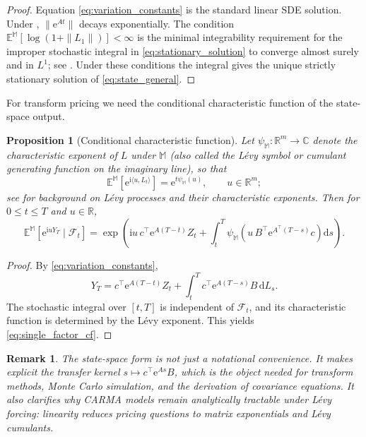 \documentclass[10pt,a4paper,reqno]{amsart}
\newtheorem{proposition}[theorem]{Proposition}
\newtheorem{remark}[theorem]{Remark}
\newcommand{\R}{\mathbb{R}}
\newcommand{\C}{\mathbb{C}}
\newcommand{\E}{\mathbb{E}}
\newcommand{\F}{\mathcal{F}}
\newcommand{\1}{\mathbbm{1}}
\newcommand{\dd}{\mathrm{d}}
\newcommand{\ii}{\mathrm{i}}
\newcommand{\ee}{\mathrm{e}}
\begin{document}
\begin{proof}
Equation \eqref{eq:variation_constants} is the standard linear SDE solution.
Under , \(\|\ee^{At}\|\) decays exponentially. The condition
\(\mathbb{E}^{\mathbb{M}}[\log(1+\|L_1\|)] < \infty\) is the minimal
integrability requirement for the improper stochastic integral in
\eqref{eq:stationary_solution} to converge almost surely and in \(L^1\);
see \citet{Bro01}. Under these conditions the integral gives the unique strictly
stationary solution of \eqref{eq:state_general}.
\end{proof}

For transform pricing we need the conditional characteristic function of the
state-space output.

\begin{proposition}[Conditional characteristic function]
\label{prop:cf_single_factor}
Let \(\psi_{\mathbb{M}}:\R^m \to \C\) denote the characteristic exponent of
\(L\) under \(\mathbb{M}\) (also called the Lévy symbol or cumulant generating
function on the imaginary line), so that
\[
\E^{\mathbb{M}}\!\left[\ee^{\ii\langle u,L_t\rangle}\right]
= \ee^{t\psi_{\mathbb{M}}(u)},\qquad u \in \R^m;
\]
see \citet{Con04} for background on Lévy processes and their characteristic
exponents.
Then for \(0 \le t \le T\) and \(u \in \R\),
\begin{equation}\label{eq:single_factor_cf}
  \E^{\mathbb{M}}\!\left[\ee^{\ii u Y_T}\mid \F_t\right]
  = \exp\!\left(
      \ii u\, c^\top \ee^{A(T-t)} Z_t
      + \int_t^T \psi_{\mathbb{M}}\!\left(
          u\, B^\top \ee^{A^\top(T-s)} c
        \right)\dd s
    \right).
\end{equation}
\end{proposition}

\begin{proof}
By \eqref{eq:variation_constants},
\[
Y_T
= c^\top \ee^{A(T-t)} Z_t
  + \int_t^T c^\top \ee^{A(T-s)} B\,\dd L_s.
\]
The stochastic integral over \([t,T]\) is independent of \(\F_t\), and its
characteristic function is determined by the Lévy exponent. This yields
\eqref{eq:single_factor_cf}.
\end{proof}

\begin{remark}
The state-space form is not just a notational convenience. It makes explicit the
transfer kernel \(s \mapsto c^\top \ee^{As} B\), which is the object needed for
transform methods, Monte Carlo simulation, and the derivation of covariance
equations. It also clarifies why CARMA models remain analytically tractable
under Lévy forcing: linearity reduces pricing questions to matrix exponentials
and Lévy cumulants.
\end{remark}
\end{document}
